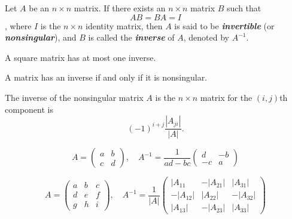 \begin{definition}
	Let $A$ be an $n \times n$ matrix. If there exists an $n \times n$ matrix $B$ such that
	\begin{equation*}
		AB = BA = I
	\end{equation*},
	where $I$ is the $n \times n$ identity matrix, then $A$ is said to be \textit{\textbf{invertible}} (or \textit{\textbf{nonsingular}}), and $B$ is called the \textit{\textbf{inverse}} of $A$, denoted by $A^{-1}$.
\end{definition}

\begin{proposition}
	A square matrix has at most one inverse.
\end{proposition}

\begin{proposition}
	A matrix has an inverse if and only if it is nonsingular.
\end{proposition}

\begin{proposition}
	The inverse of the nonsingular matrix $A$ is the $n \times n$ matrix for the $(i,j)$th component is \begin{equation*}
		(-1)^{i+j}\frac{|A_{ji}|}{|A|}.
	\end{equation*}
\end{proposition}

\begin{example}
	\begin{equation*}
		A = \begin{pmatrix}
			a & b \\
			c & d
		\end{pmatrix},\quad A^{-1} = \frac{1}{ad-bc}\begin{pmatrix}
			d  & -b \\
			-c & a
		\end{pmatrix}
	\end{equation*}
\end{example}
\begin{example}
	\begin{equation*}
		A = \begin{pmatrix}
			a & b & c \\
			d & e & f \\
			g & h & i
		\end{pmatrix},\quad A^{-1}=\frac{1}{|A|}\begin{pmatrix}
			|A_{11}   & -|A_{21}| & |A_{31}|  \\
			-|A_{12}| & |A_{22}|  & -|A_{32}| \\
			|A_{13}|  & -|A_{23}| & |A_{33}|
		\end{pmatrix}
	\end{equation*}
\end{example}

